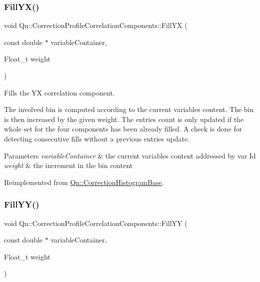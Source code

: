 \subsubsection{\texorpdfstring{Fill\+Y\+X()}{FillYX()}}
{\footnotesize\ttfamily void Qn\+::\+Correction\+Profile\+Correlation\+Components\+::\+Fill\+YX (\begin{DoxyParamCaption}\item[{const double $\ast$}]{variable\+Container,  }\item[{Float\+\_\+t}]{weight }\end{DoxyParamCaption})\hspace{0.3cm}{\ttfamily [virtual]}}

Fills the YX correlation component.

The involved bin is computed according to the current variables content. The bin is then increased by the given weight. The entries count is only updated if the whole set for the four components has been already filled. A check is done for detecting consecutive fills without a previous entries update.


\begin{DoxyParams}{Parameters}
{\em variable\+Container} & the current variables content addressed by var Id \\
\hline
{\em weight} & the increment in the bin content \\
\hline
\end{DoxyParams}


Reimplemented from \mbox{\hyperlink{classQn_1_1CorrectionHistogramBase_a70d3afc8ffdca9af505143d365c210bc}{Qn\+::\+Correction\+Histogram\+Base}}.

\mbox{\label{classQn_1_1CorrectionProfileCorrelationComponents_af033e682edd09ce172db1f23cf4d6865}} 
\subsubsection{\texorpdfstring{Fill\+Y\+Y()}{FillYY()}}
{\footnotesize\ttfamily void Qn\+::\+Correction\+Profile\+Correlation\+Components\+::\+Fill\+YY (\begin{DoxyParamCaption}\item[{const double $\ast$}]{variable\+Container,  }\item[{Float\+\_\+t}]{weight }\end{DoxyParamCaption})\hspace{0.3cm}{\ttfamily [virtual]}}

